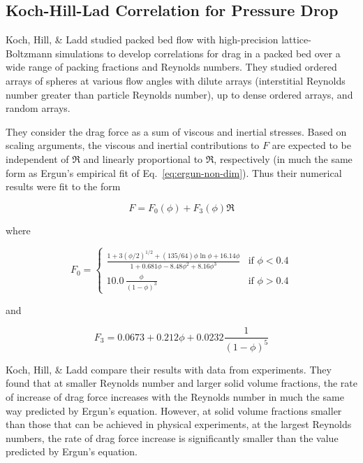 \subsection{Koch-Hill-Lad Correlation for Pressure Drop}
Koch, Hill, \& Ladd studied packed bed flow with high-precision lattice-Boltzmann simulations to develop correlations for drag in a packed bed over a wide range of packing fractions and Reynolds numbers.\cite{Koch2001,Hill2001a,Hill2001} They studied ordered arrays of spheres at various flow angles with dilute arrays (interstitial Reynolds number greater than particle Reynolds number), up to dense ordered arrays, and random arrays.

They consider the drag force as a sum of viscous and inertial stresses. Based on scaling arguments, the viscous and inertial contributions to $F$ are expected to be independent of $\Re$ and linearly proportional to $\Re$, respectively (in much the same form as Ergun's empirical fit of Eq.~\ref{eq:ergun-non-dim}). Thus their numerical results were fit to the form

\begin{equation}\label{eq:khl-correlation}
	F = F_0(\phi) + F_3(\phi)\Re
\end{equation}

where 

\begin{equation}
F_0 = \begin{cases}
	\frac{1+3(\phi/2)^{1/2} + (135/64)\phi\ln\phi + 16.14\phi}{1 + 0.681\phi - 8.48 \phi^2 + 8.16\phi^3} & \text{if $\phi < 0.4$}\\
	10.0\,\frac{\phi}{(1-\phi)^3} & \text{if $\phi > 0.4$} 
	\end{cases}
\end{equation}

and

\begin{equation}
	F_3 = 0.0673 + 0.212\phi + 0.0232 \frac{1}{(1-\phi)^5}
\end{equation}

Koch, Hill, \& Ladd\cite{Hill2001, Koch2001, Gruber2012, Benyahia2006} compare their results with data from experiments. They found that at smaller Reynolds number and larger solid volume fractions, the rate of increase of drag force increases with the Reynolds number in much the same way predicted by Ergun’s equation. However, at solid volume fractions smaller than those that can be achieved in physical experiments, at the largest Reynolds numbers, the rate of drag force increase is significantly smaller than the value predicted by Ergun's equation.


